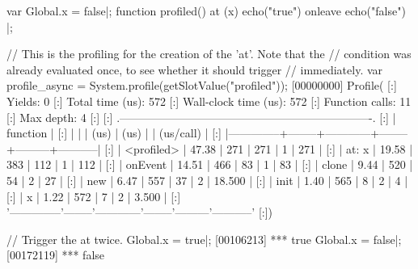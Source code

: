 \begin{urbiscript}
var Global.x = false|;
function profiled()
{
  at (x)
    echo("true")
  onleave
    echo("false")
}|;

// This is the profiling for the creation of the 'at'. Note that the
// condition was already evaluated once, to see whether it should trigger
// immediately.
var profile_async = System.profile(getSlotValue("profiled"));
[00000000] Profile(
[:]  Yields:                    0
[:]  Total time (us):         572
[:]  Wall-clock time (us):    572
[:]  Function calls:           11
[:]  Max depth:                 4
[:]
[:]  .-------------------------------------------------------------------.
[:]  |   function   |   %
[:]  |              |        |    (us)    |  (us)  |         | (us/call) |
[:]  |--------------+--------+------------+--------+---------+-----------|
[:]  |   <profiled> |  47.38 |        271 |    271 |       1 |       271 |
[:]  |    at: { x } |  19.58 |        383 |    112 |       1 |       112 |
[:]  |      onEvent |  14.51 |        466 |     83 |       1 |        83 |
[:]  |        clone |   9.44 |        520 |     54 |       2 |        27 |
[:]  |          new |   6.47 |        557 |     37 |       2 |    18.500 |
[:]  |         init |   1.40 |        565 |      8 |       2 |         4 |
[:]  |            x |   1.22 |        572 |      7 |       2 |     3.500 |
[:]  '--------------'--------'------------'--------'---------'-----------'
[:])

// Trigger the at twice.
Global.x = true|;
[00106213] *** true
Global.x = false|;
[00172119] *** false


\end{urbiscript}
